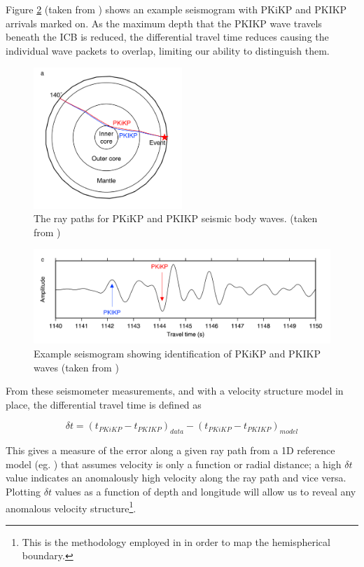\documentclass[11pt,a4paper]{article}
\begin{document}
Figure \ref{fig:Seismogram} (taken from \cite{Waszek2011a}) shows an example seismogram with PKiKP and PKIKP arrivals marked on. As the maximum depth that the PKIKP wave travels beneath the ICB is reduced, the differential travel time reduces causing the individual wave packets to overlap, limiting our ability to distinguish them.

\begin{figure}
	\centering
	\includegraphics[width=0.5\textwidth]{RayPaths.png}
	\caption{The ray paths for PKiKP and PKIKP seismic body waves. (taken from \cite{Waszek2011a})}
	\label{fig:RayPaths}
\end{figure}

\begin{figure}
	\centering
	\includegraphics[width=\textwidth]{Seismogram.png}
	\caption{Example seismogram showing identification of PKiKP and PKIKP waves (taken from \cite{Waszek2011a})}
	\label{fig:Seismogram}
\end{figure}



From these seismometer measurements, and with a velocity structure model in place, the differential travel time is defined as

\begin{equation}
	\delta t = (t_{PKiKP} - t_{PKIKP})_{data} - (t_{PKiKP} - t_{PKIKP})_{model}
\end{equation}

This gives a measure of the error along a given ray path from a 1D reference model (eg. \cite{Kennett1995}) that assumes velocity is only a function or radial distance; a high $\delta t$ value indicates an anomalously high velocity along the ray path and vice versa. Plotting $\delta t$ values as a function of depth and longitude will allow us to reveal any anomalous velocity structure\footnote{This is the methodology employed in \cite{Waszek2011a} in order to map the hemispherical boundary.}.
\end{document}
